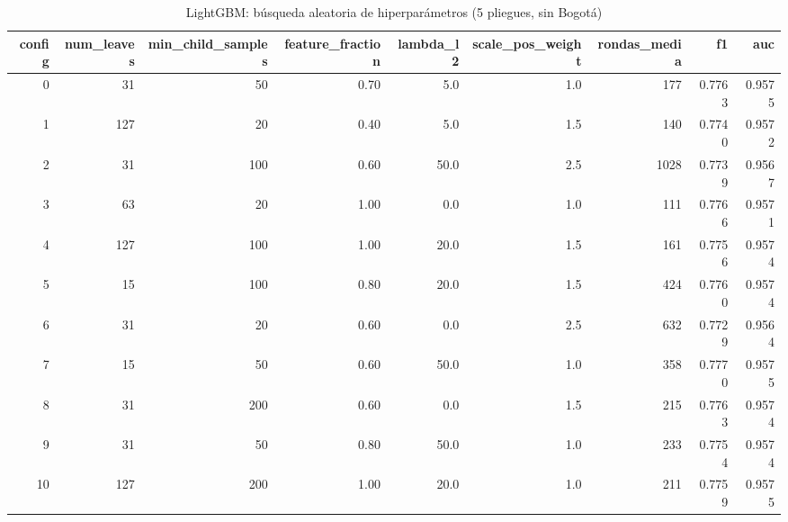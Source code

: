 \begin{table}[ht]
\centering
\begin{tabular}{rrrrrrrrr}
  \hline
config & num\_leaves & min\_child\_samples & feature\_fraction & lambda\_l2 & scale\_pos\_weight & rondas\_media & f1 & auc \\ 
  \hline
0 & 31 & 50 & 0.70 & 5.0 & 1.0 & 177 & 0.7763 & 0.9575 \\ 
  1 & 127 & 20 & 0.40 & 5.0 & 1.5 & 140 & 0.7740 & 0.9572 \\ 
  2 & 31 & 100 & 0.60 & 50.0 & 2.5 & 1028 & 0.7739 & 0.9567 \\ 
  3 & 63 & 20 & 1.00 & 0.0 & 1.0 & 111 & 0.7766 & 0.9571 \\ 
  4 & 127 & 100 & 1.00 & 20.0 & 1.5 & 161 & 0.7756 & 0.9574 \\ 
  5 & 15 & 100 & 0.80 & 20.0 & 1.5 & 424 & 0.7760 & 0.9574 \\ 
  6 & 31 & 20 & 0.60 & 0.0 & 2.5 & 632 & 0.7729 & 0.9564 \\ 
  7 & 15 & 50 & 0.60 & 50.0 & 1.0 & 358 & 0.7770 & 0.9575 \\ 
  8 & 31 & 200 & 0.60 & 0.0 & 1.5 & 215 & 0.7763 & 0.9574 \\ 
  9 & 31 & 50 & 0.80 & 50.0 & 1.0 & 233 & 0.7754 & 0.9574 \\ 
  10 & 127 & 200 & 1.00 & 20.0 & 1.0 & 211 & 0.7759 & 0.9575 \\ 
   \hline
\end{tabular}
\caption{LightGBM: búsqueda aleatoria de hiperparámetros (5 pliegues, sin Bogotá)} 
\end{table}
